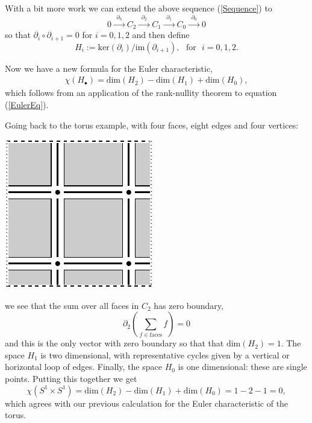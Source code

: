\documentclass[11pt,twoside,openright]{report}
\newcommand{\Eref}[1]{(\ref{#1})}
\def\Im{\mathrm{im}}
\def\Ker{\mathrm{ker}}
\def\Dim{\mathrm{dim}}
\def\euler{\chi}
\begin{document}
With a bit more work we can extend the above sequence \Eref{Sequence} to
$$
  0 \xrightarrow{\ \ \partial_3\ \ } 
    C_2 \xrightarrow{\ \ \partial_2\ \ } 
    C_1 \xrightarrow{\ \ \partial_1\ \ } 
    C_0 \xrightarrow{\ \ \partial_0\ \ } 0
$$
so that $\partial_i \circ \partial_{i+1}=0$ 
for $i=0,1,2$
and then define
$$
    H_i := \Ker(\partial_i) / \Im(\partial_{i+1}),\ \ \ \mbox{for}\ \ \ i=0,1,2.
$$

Now we have a new formula for the Euler characteristic,
\begin{align}\label{EulerHom}
    \euler(H_{\bullet}) = \mbox{dim}(H_2) - \mbox{dim}(H_1) + \mbox{dim}(H_0),
\end{align}
which follows from
an application of the rank-nullity theorem to
equation \Eref{EulerEq}.

Going back to the torus example, with four faces,
eight edges and four vertices:
\begin{center}
\includegraphics{pic-torus-hom.pdf}
\end{center}
we see that the sum over all faces in $C_2$
has zero boundary,
$$
    \partial_2(\sum_{f\in\text{faces}} f) = 0
$$
and this is the only vector with zero boundary so that
that $\Dim(H_2)=1$.
The space $H_1$ is two dimensional, with representative
cycles given by a vertical or horizontal loop of edges.
Finally, the space $H_0$ is one dimensional: these
are single points.
Putting this together we get
$$
    \euler(S^1\times S^1) = 
    \mbox{dim}(H_2) - \mbox{dim}(H_1) + \mbox{dim}(H_0) = 1-2-1 = 0,
$$
which agrees with our previous calculation for the Euler
characteristic of the torus.

\end{document}
